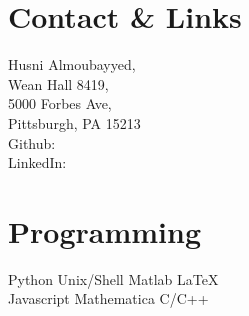 \documentclass[]{deedy-resume-openfont}
\begin{document}
%
%

%
%


%
%

\begin{minipage}[t]{0.33\textwidth} 



$\; 
\;
\;$


\section{\color{Blue} Contact \& Links} 
Husni Almoubayyed,\\ 
Wean Hall 8419, \\ 5000 Forbes Ave, \\ Pittsburgh, PA 15213 \\
Github: \href{https://github.com/hsnee}{} \\
LinkedIn:  \href{https://www.linkedin.com/in/husnialmoubayyed}{} 
\sectionsep




\section{\color{Blue} Programming}
\textbullet{} Python  \textbullet{} Unix/Shell \textbullet{} Matlab \textbullet{} \LaTeX   \\
 \textbullet{} Javascript \textbullet{} Mathematica  \textbullet{}  C/C++\\
\sectionsep




\end{minipage}
\end{document}
